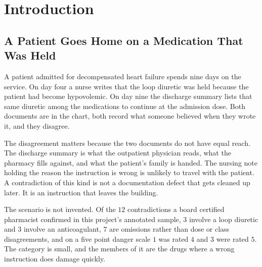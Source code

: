 %
%
%
%

\chapter{Introduction}
\label{ch:intro}

\section{A Patient Goes Home on a Medication That Was Held}
\label{sec:intro-problem}

A patient admitted for decompensated heart failure spends nine days on the
service. On day four a nurse writes that the loop diuretic was held because the
patient had become hypovolemic. On day nine the discharge summary lists that
same diuretic among the medications to continue at the admission dose. Both
documents are in the chart, both record what someone believed when they wrote
it, and they disagree.

The disagreement matters because the two documents do not have equal reach. The
discharge summary is what the outpatient physician reads, what the pharmacy
fills against, and what the patient's family is handed. The nursing note holding
the reason the instruction is wrong is unlikely to travel with the patient. A
contradiction of this kind is not a documentation defect that gets cleaned up
later. It is an instruction that leaves the building.

The scenario is not invented. Of the $12$ contradictions a board certified
pharmacist confirmed in this project's annotated sample, $3$ involve a loop
diuretic and $3$ involve an anticoagulant, $7$ are omissions rather than dose or
class disagreements, and on a five point danger scale $1$ was rated $4$ and $3$
were rated $5$. The category is small, and the members of it are the drugs where
a wrong instruction does damage quickly.

